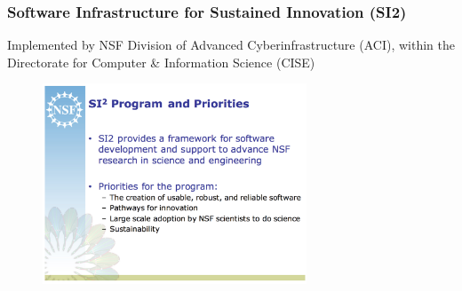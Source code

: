 \begin{frame}
\frametitle{Software Infrastructure for Sustained Innovation (SI2)}

\small{Implemented by NSF Division of Advanced Cyberinfrastructure (ACI), within the Directorate for Computer \& Information Science (CISE)}

\begin{figure}[htbp]
\begin{center}
\includegraphics[width=0.7\textwidth]{images/nsf-si2-priorities.png}
\label{fig:example2}
\end{center}
\end{figure}

\end{frame}


